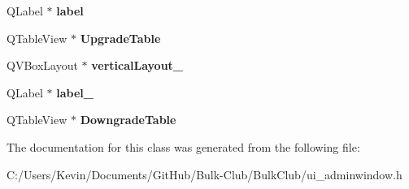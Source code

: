 \begin{DoxyCompactItemize}
Q\+Label $\ast$ {\bfseries label}
\item 
\mbox{\label{class_ui___admin_window_a4f81b4b094ec0e2205c83d1f5d7d5cab}} 
Q\+Table\+View $\ast$ {\bfseries Upgrade\+Table}
\item 
\mbox{\label{class_ui___admin_window_a1f904d791dbf9d77bc272e2e55f20156}} 
Q\+V\+Box\+Layout $\ast$ {\bfseries vertical\+Layout\+\_}
\item 
\mbox{\label{class_ui___admin_window_afcb0e33e50030e9d45d5c424abee03d9}} 
Q\+Label $\ast$ {\bfseries label\+\_}
\item 
\mbox{\label{class_ui___admin_window_a9dc6e54fb2b059821ce67df3a07893c2}} 
Q\+Table\+View $\ast$ {\bfseries Downgrade\+Table}
\end{DoxyCompactItemize}


The documentation for this class was generated from the following file\+:\begin{DoxyCompactItemize}
\item 
C\+:/\+Users/\+Kevin/\+Documents/\+Git\+Hub/\+Bulk-\/\+Club/\+Bulk\+Club/ui\+\_\+adminwindow.\+h\end{DoxyCompactItemize}

